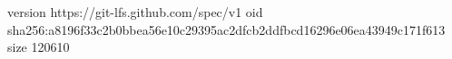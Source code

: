 version https://git-lfs.github.com/spec/v1
oid sha256:a8196f33c2b0bbea56e10c29395ac2dfcb2ddfbcd16296e06ea43949c171f613
size 120610
